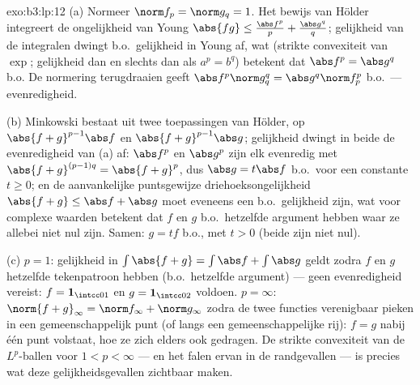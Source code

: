 \begin{solution}{exo:b3:lp:12}
(a) Normeer $\norm f_p = \norm g_q = 1$. Het bewijs van Hölder
integreert de ongelijkheid van Young $\abs{fg} \leq \frac{\abs
f^p}p + \frac{\abs g^q}q$; gelijkheid van de integralen dwingt
b.o.\ gelijkheid in Young af, wat (strikte convexiteit van
$\exp$; gelijkheid dan en slechts dan als $a^p = b^q$) betekent
dat $\abs f^p = \abs g^q$ b.o. De normering terugdraaien geeft
$\abs f^p\norm g_q^q = \abs g^q\norm f_p^p$ b.o.\ ---
evenredigheid.

(b) Minkowski bestaat uit twee toepassingen van Hölder, op
$\abs{f + g}^{p-1}\abs f$ en $\abs{f+g}^{p-1}\abs g$; gelijkheid
dwingt in beide de evenredigheid van (a) af: $\abs f^p$ en $\abs
g^p$ zijn elk evenredig met $\abs{f+g}^{(p-1)q} =
\abs{f+g}^p$, dus $\abs g = t\abs f$ b.o.\ voor een constante $t
\geq 0$; en de aanvankelijke puntsgewijze driehoeksongelijkheid
$\abs{f + g} \leq \abs f + \abs g$ moet eveneens een b.o.\
gelijkheid zijn, wat voor complexe waarden betekent dat $f$ en
$g$ b.o.\ hetzelfde argument hebben waar ze allebei niet nul
zijn. Samen: $g = tf$ b.o., met $t > 0$ (beide zijn niet nul).

(c) $p = 1$: gelijkheid in $\int\abs{f + g} = \int\abs f +
\int\abs g$ geldt zodra $f$ en $g$ hetzelfde tekenpatroon hebben
(b.o.\ hetzelfde argument) --- geen evenredigheid vereist: $f =
\mathbf 1_{\intcc01}$ en $g = \mathbf 1_{\intcc02}$ voldoen. $p =
\infty$: $\norm{f+g}_\infty = \norm f_\infty + \norm g_\infty$
zodra de twee functies verenigbaar pieken in een gemeenschappelijk
punt (of langs een gemeenschappelijke rij): $f = g$ nabij één
punt volstaat, hoe ze zich elders ook gedragen. De strikte
convexiteit van de $L^p$-ballen voor $1 < p < \infty$ --- en het
falen ervan in de randgevallen --- is precies wat deze
gelijkheidsgevallen zichtbaar maken.
\end{solution}

